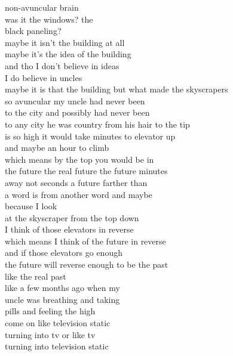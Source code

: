 \begin{flushleft}
\begin{paracol}{3}
non-avuncular brain\\
was it the windows? the\\
black paneling?\\
maybe it isn’t the building at all\\
maybe it’s the idea of the building\\
and tho I don’t believe in ideas\\
I do believe in uncles\\
maybe it is that the building
but what made the skyscrapers\\
so avuncular my uncle had never been\\
to the city and possibly had never been\\
to any city he was country from his hair to the tip\\
\switchcolumn[2]
is so high it would take minutes to elevator up\\ %
and maybe an hour to climb\\
which means by the top you would be in\\
the future the real future the future minutes\\
away not seconds a future farther than\\
a word is from another word and maybe\\
because I look\\
at the skyscraper from the top down\\
I think of those elevators in reverse\\
which means I think of the future in reverse\\
and if those elevators go enough\\
the future will reverse enough to be the past\\
like the real past\\
like a few months ago when my\\
uncle was breathing and taking\\
pills and feeling the high\\
come on like television static\\
turning into tv or like tv\\
turning into television static
\end{paracol}
\end{flushleft}